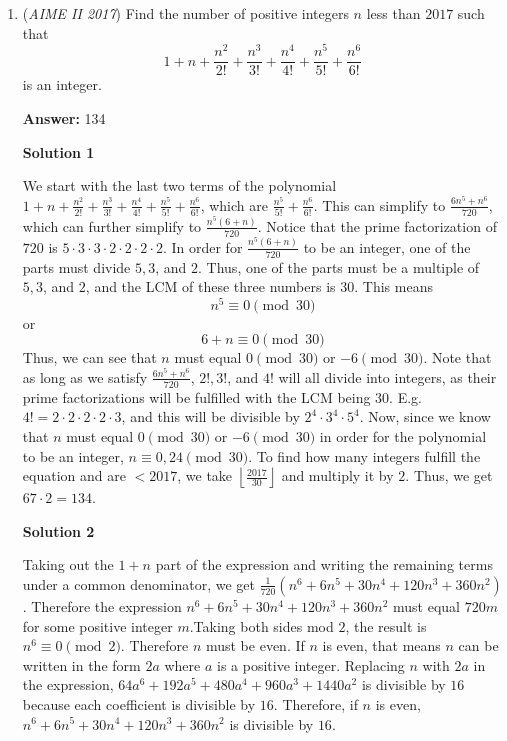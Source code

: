 \begin{enumerate}
 


	\item (\textit{AIME II 2017}) Find the number of positive integers $n$ less than $2017$ such that 
 \[1+n+\frac{n^2}{2!}+\frac{n^3}{3!}+\frac{n^4}{4!}+\frac{n^5}{5!}+\frac{n^6}{6!}\] is an integer.


 
 \textbf{Answer: }134



\textbf{Solution 1}

We start with the last two terms of the polynomial $1+n+\frac{n^2}{2!}+\frac{n^3}{3!}+\frac{n^4}{4!}+\frac{n^5}{5!}+\frac{n^6}{6!}$, which are $\frac{n^5}{5!}+\frac{n^6}{6!}$. This can simplify to $\frac{6n^5+n^6}{720}$, which can further simplify to $\frac{n^5(6+n)}{720}$. Notice that the prime factorization of $720$ is $5\cdot3\cdot3\cdot2\cdot2\cdot2\cdot2$. In order for $\frac{n^5(6+n)}{720}$ to be an integer, one of the parts must divide $5, 3$, and $2$. Thus, one of the parts must be a multiple of $5, 3$, and $2$, and the LCM  of these three numbers is $30$. This means 
 \[n^5 \equiv 0\pmod{30}\] or 
 \[6+n \equiv 0\pmod{30}\] Thus, we can see that $n$ must equal $0\pmod{30}$ or $-6\pmod{30}$. Note that as long as we satisfy $\frac{6n^5+n^6}{720}$, $2!, 3!$, and $4!$ will all divide into integers, as their prime factorizations will be fulfilled with the LCM being 30. E.g. $4! = 2\cdot2\cdot2\cdot2\cdot3$, and this will be divisible by $2^4\cdot3^4\cdot5^4$. Now, since we know that $n$ must equal $0\pmod{30}$ or $-6\pmod{30}$ in order for the polynomial to be an integer, $n\equiv0, 24\pmod{30}$. To find how many integers fulfill the equation and are $<2017$, we take $\left \lfloor\frac{2017}{30} \right \rfloor$ and multiply it by $2$. Thus, we get $67\cdot2=\boxed{134}$.

 



\textbf{Solution 2}

Taking out the $1+n$ part of the expression and writing the remaining terms under a common denominator, we get $\frac{1}{720}(n^6+6n^5+30n^4+120n^3+360n^2)$. Therefore the expression $n^6+6n^5+30n^4+120n^3+360n^2$ must equal $720m$ for some positive integer $m$.Taking both sides mod $2$, the result is $n^6 \equiv 0 \pmod{2}$. Therefore $n$ must be even. If $n$ is even, that means $n$ can be written in the form $2a$ where $a$ is a positive integer. Replacing $n$ with $2a$ in the expression, $64a^6+192a^5+480a^4+960a^3+1440a^2$ is divisible by $16$ because each coefficient is divisible by $16$. Therefore, if $n$ is even, $n^6+6n^5+30n^4+120n^3+360n^2$ is divisible by $16$.


\end{enumerate}
